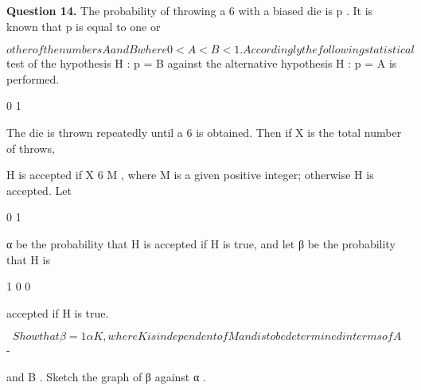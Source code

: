 \documentclass[12pt]{article}
\begin{document}
\begin{flushleft}
\bigskip\textbf{Question 14.} The probability of throwing a 6 with a biased die is p . It is known that p is equal to one or\par
\[other of the numbers A and B where 0 < A < B < 1 . Accordingly the following statistical\]
test of the hypothesis H : p = B against the alternative hypothesis H : p = A is performed.\par
0 1\par
The die is thrown repeatedly until a 6 is obtained. Then if X is the total number of throws,\par
H is accepted if X 6 M , where M is a given positive integer; otherwise H is accepted. Let\par
0 1\par
α be the probability that H is accepted if H is true, and let β be the probability that H is\par
1 0 0\par
accepted if H is true.\par
\[Show that β = 1 αK , where K is independent of M and is to be determined in terms of A\]
-\par
and B . Sketch the graph of β against α .\par
\end{flushleft}
\end{document}

